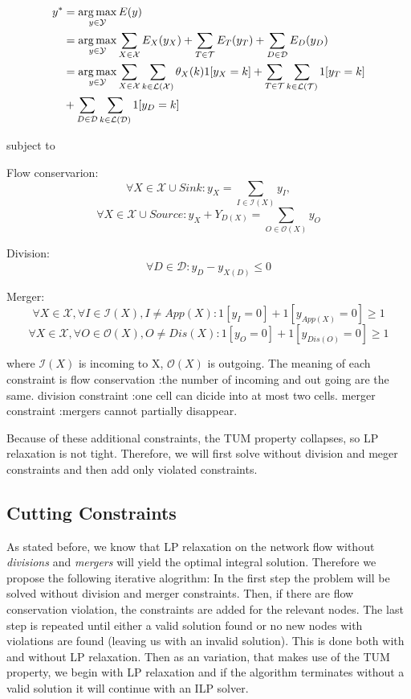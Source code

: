 \documentclass[10pt,twocolumn,letterpaper]{article}
\begin{document}
\begin{scriptsize}
\begin{equation*}
\begin{split}
 y^* &= \operatorname*{arg\,max}_{y\in\mathcal{Y}} E(y) \\ 
     &= \operatorname*{arg\,max}_{y\in\mathcal{Y}} \sum\limits_{X\in\mathcal{X}} E_X(y_X) + \sum\limits_{T\in\mathcal{T}} E_T(y_T) + \sum\limits_{D\in\mathcal{D}} E_D(y_D) \\
     &= \operatorname*{arg\,max}_{y\in\mathcal{Y}} \sum\limits_{X\in\mathcal{X}} \sum\limits_{k\in\mathcal{L(X)}} \theta_X(k) 1[y_X = k] + \sum\limits_{T\in\mathcal{T}} \sum\limits_{k\in\mathcal{L(T)}} 1[y_T = k] \newline \\
     & + \sum\limits_{D\in\mathcal{D}} \sum\limits_{k\in\mathcal{L(D)}} 1[y_D = k] 
\end{split}
\end{equation*}

subject to

Flow conservarion:
\[
\forall X\in\mathcal{X} \cup Sink : y_{X} = \sum\limits_{I\in\mathcal{I}(X)}y_{I}, 
\]
\[
\forall X\in\mathcal{X} \cup Source : y_{X} + Y_{D(X)} = \sum\limits_{O\in\mathcal{O}(X)}y_{O}
\]

Division:
\[
\forall D\in\mathcal{D} : y_{D} - y_{X(D)} \leq 0
\]

Merger:
\[
\forall X\in\mathcal{X}, \forall I\in\mathcal{I}(X),I \neq App(X) : 1[y_{I}=0]+1[y_{App(X)}=0] \geq 1
\]
\[
\forall X\in\mathcal{X}, \forall O\in\mathcal{O}(X),O \neq Dis(X) : 1[y_{O}=0]+1[y_{Dis(O)}=0] \geq 1
\]
\end{scriptsize}

where $\mathcal{I}(X)$ is incoming to X, $\mathcal{O}(X)$ is outgoing. The meaning of each constraint is
flow conservation :the number of incoming and out going are the same.
division constraint :one cell can dicide into at most two cells.
merger constraint :mergers cannot partially disappear.

Because of these additional constraints, the TUM property collapses, so LP relaxation is not tight.
Therefore, we will first solve without division and meger constraints and then add only violated constraints.

\subsection{Cutting Constraints}

As stated before, we know that LP relaxation on the network flow without \textit{divisions} and \textit{mergers} will yield the optimal integral solution. Therefore we propose the following iterative alogrithm: In the first step the problem will be solved without division and merger constraints. Then, if there are flow conservation violation, the constraints are added for the relevant nodes. The last step is repeated until either a valid solution found or no new nodes with violations are found (leaving us with an invalid solution). This is done both with and without LP relaxation. Then as an variation, that makes use of the TUM property, we begin with LP relaxation and if the algorithm terminates without a valid solution it will continue with an ILP solver.
\end{document}
